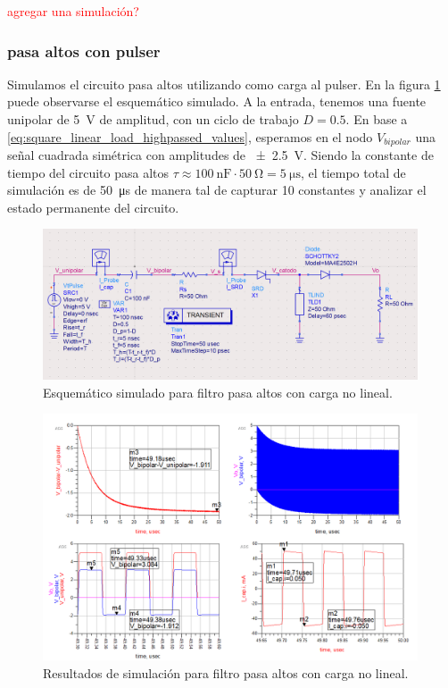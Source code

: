 \textcolor{red}{agregar una simulación?}

\subsubsection{pasa altos con pulser}
\label{sec:carga_no_lineal}

Simulamos el circuito pasa altos utilizando como carga al pulser. En la figura
\ref{fig:highpass_filter_nonlinear_load_sch} puede observarse el esquemático
simulado. A la entrada, tenemos una fuente unipolar de \qty{5}{\volt} de
amplitud, con un ciclo de trabajo $D=0.5$. En base a
\ref{eq:square_linear_load_highpassed_values}, esperamos en el nodo
$V_{bipolar}$ una señal cuadrada simétrica con amplitudes de
\qty{\pm2.5}{\volt}. Siendo la constante de tiempo del circuito pasa altos $\tau
\approx \qty{100}{\nano\farad} \cdot \qty{50}{\ohm} = \qty{5}{\micro\second}$,
el tiempo total de simulación es de \qty{50}{\micro\second} de manera tal de
capturar 10 constantes y analizar el estado permanente del circuito.

\begin{figure}[tbp]
    \centering
    \includegraphics[width=0.99\textwidth]{images/highpass_filter_nonlinear_load_sch.png}
    \caption{Esquemático simulado para filtro pasa altos con carga no lineal.}
    \label{fig:highpass_filter_nonlinear_load_sch}
\end{figure}

\begin{figure}[tbp]
    \centering
    \includegraphics[width=0.99\textwidth]{images/highpass_filter_nonlinear_load_sim_result.png}
    \caption{Resultados de simulación para filtro pasa altos con carga no lineal.}
    \label{fig:highpass_filter_nonlinear_load_sim_result}
\end{figure}

